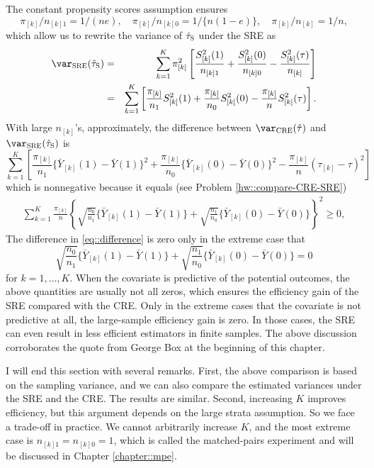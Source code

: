 The constant propensity scores assumption ensures 
$$ 
\pi_{[k]} / n_{[k]1}  = 1/(ne), \quad   \pi_{[k]} / n_{[k]0} = 1/\{n(1-e) \},\quad \pi_{[k]} / n_{[k]} = 1/n,
$$
which allow us to  rewrite the variance of $\hat{\tau}_\textsc{S}$ under the SRE as
\begin{eqnarray*}
\var_\textsc{SRE}(\hat{\tau}_\textsc{S}) &= & \sum_{k=1}^K  \pi_{[k]}^2 \left[ \frac{S_{[k]}^2(1)}{ n_{[k]1} } +  \frac{S_{[k]}^2(0)}{ n_{[k]0} }
- \frac{  S_{[k]}^2(\tau) }{ n_{[k]} } \right]\\
&=&\sum_{k=1}^K  \left[   \frac{ \pi_{[k]}}{n_1}  S_{[k]}^2(1) + \frac{ \pi_{[k]}}{n_0}  S_{[k]}^2(0) -  \frac{ \pi_{[k]}}{n}    S_{[k]}^2(\tau) \right] .
\end{eqnarray*}
 With large $n_{[k]}$'s, approximately, the difference between $\var_{\text{CRE}}(  \hat{\tau} )$ and $\var_\textsc{SRE}(\hat{\tau}_\textsc{S})$ is 
$$
\sum_{k=1}^K  \left[    \frac{ \pi_{[k]}}{n_1}  \{ \bar{Y}_{[k]}(1) - \bar{Y}(1) \}^2 +  \frac{ \pi_{[k]}}{n_0}  \{ \bar{Y}_{[k]}(0) - \bar{Y}(0) \}^2  
 - \frac{  \pi_{[k]}  }{n}  ( \tau_{[k]} - \tau  ) ^2  \right] 
 $$
 which is nonnegative because it equals (see Problem \ref{hw::compare-CRE-SRE})
 \begin{eqnarray}
\label{eq::difference}
\sum_{k=1}^K\frac{ \pi_{[k]}}{n} 
 \left\{
\sqrt{ \frac{n_0}{n_1} } \{ \bar{Y}_{[k]}(1) - \bar{Y}(1) \} +  \sqrt{ \frac{n_1}{n_0} } \{ \bar{Y}_{[k]}(0) - \bar{Y}(0) \}
 \right\}^2 \geq 0,
\end{eqnarray} 
The difference in \eqref{eq::difference} is zero only in the extreme case that
$$
\sqrt{ \frac{n_0}{n_1} } \{ \bar{Y}_{[k]}(1) - \bar{Y}(1) \} +  \sqrt{ \frac{n_1}{n_0} } \{ \bar{Y}_{[k]}(0) - \bar{Y}(0) \}
= 0 
$$
for $k=1,\ldots, K$. When the covariate is predictive of the potential outcomes, the above quantities are usually not all zeros, which ensures the efficiency gain of the SRE compared with the CRE. Only in the extreme cases that the covariate is not predictive at all, the large-sample efficiency gain is zero. In those cases, the SRE can even result in less efficient estimators in finite samples. The above discussion corroborates the quote from George Box at the beginning of this chapter. 

 


I will end this section with several remarks. First, the above comparison is based on the sampling variance, and we can also compare the estimated variances under the SRE and the CRE. The results are similar. Second,  increasing $K$ improves efficiency, but this argument depends on the large strata assumption. So we face a trade-off in practice.  We cannot arbitrarily increase $K$, and the most extreme case is $n_{[k]1} = n_{[k]0} = 1$, which is called the matched-pairs experiment and will be discussed in Chapter \ref{chapter::mpe}. 

